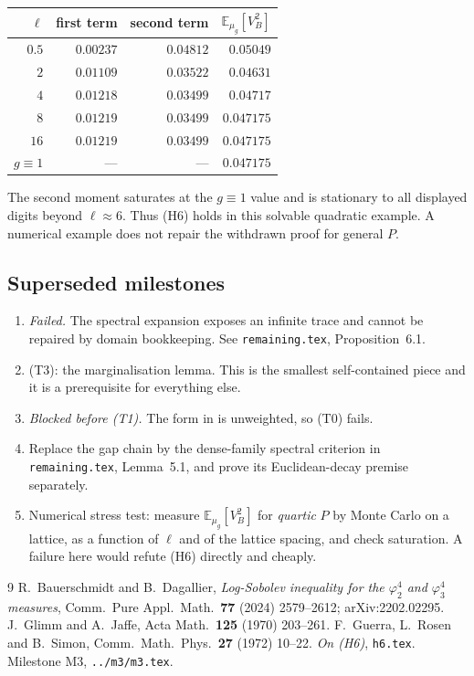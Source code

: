 \documentclass[11pt,a4paper]{article}
\theoremstyle{plain}
\theoremstyle{definition}
\newcommand{\E}{\mathbb{E}}
\begin{document}
\begin{center}
\begin{tabular}{rrrr}
\toprule
$\ell$ & first term & second term & $\E_{\mu_g}[V_B^2]$\\
\midrule
$0.5$ & $0.00237$ & $0.04812$ & $0.05049$\\
$2$   & $0.01109$ & $0.03522$ & $0.04631$\\
$4$   & $0.01218$ & $0.03499$ & $0.04717$\\
$8$   & $0.01219$ & $0.03499$ & $0.047175$\\
$16$  & $0.01219$ & $0.03499$ & $0.047175$\\
\midrule
$g\equiv1$ & --- & --- & $0.047175$\\
\bottomrule
\end{tabular}
\end{center}

The second moment saturates at the $g\equiv1$ value and is stationary to all displayed digits
beyond $\ell\approx6$.  Thus (H6) holds in this solvable quadratic example.  A numerical example
does not repair the withdrawn proof for general $P$.

\subsection*{Superseded milestones}

\begin{enumerate}
\item[\textbf{A}] \emph{Failed.}  The spectral expansion exposes an infinite trace and cannot be
      repaired by domain bookkeeping.  See \texttt{remaining.tex}, Proposition~6.1.
\item[\textbf{B}] (T3): the marginalisation lemma. This is the smallest self-contained piece and
      it is a prerequisite for everything else.
\item[\textbf{C}] \emph{Blocked before (T1).}  The form in \cite{BD} is unweighted, so (T0) fails.
\item[\textbf{D}] Replace the gap chain by the dense-family spectral criterion in
      \texttt{remaining.tex}, Lemma~5.1, and prove its Euclidean-decay premise separately.
\item[\textbf{E}] Numerical stress test: measure $\E_{\mu_g}[V_B^2]$ for \emph{quartic} $P$ by
      Monte Carlo on a lattice, as a function of $\ell$ and of the lattice spacing, and check
      saturation. A failure here would refute (H6) directly and cheaply.
\end{enumerate}

\begin{thebibliography}{9}
 R.~Bauerschmidt and B.~Dagallier, \emph{Log-Sobolev inequality for the
$\varphi^4_2$ and $\varphi^4_3$ measures}, Comm.\ Pure Appl.\ Math.\ \textbf{77} (2024)
2579--2612; arXiv:2202.02295.
 J.~Glimm and A.~Jaffe, Acta Math.\ \textbf{125} (1970) 203--261.
 F.~Guerra, L.~Rosen and B.~Simon, Comm.\ Math.\ Phys.\ \textbf{27} (1972) 10--22.
 \emph{On (H6)}, \texttt{h6.tex}.
 Milestone M3, \texttt{../m3/m3.tex}.
\end{thebibliography}
\end{document}
